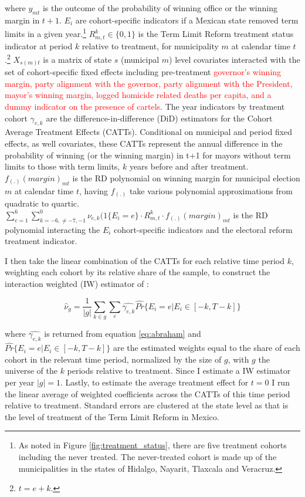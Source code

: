 \documentclass[12pt]{amsart}
\numberwithin{equation}{section}
\theoremstyle{definition}
\theoremstyle{definition}
\theoremstyle{definition}
\begin{document}
where $y_{mt}$ is the outcome of the probability of winning office or the winning margin in $t+1$. $E_i$ are cohort-specific indicators if a Mexican state removed term limits in a given year.\footnote{As noted in Figure \ref{fig:treatment_status}, there are five treatment cohorts including the never treated. The never-treated cohort is made up of the municipalities in the states of Hidalgo, Nayarit, Tlaxcala and Veracruz.} $R^k_{m,t}\in \{0,1\}$  is the Term Limit Reform treatment status indicator at period $k$ relative to treatment, for municipality $m$ at calendar time $t$.\footnote{$t=e+k$.} $X_{s(m)t}$ is a matrix of state $s$ (municipal $m$) level covariates interacted with the set of cohort-specific fixed effects including pre-treatment \textcolor{red}{governor's winning margin, party alignment with the governor, party alignment with the President, mayor's winning margin, logged homicide related deaths per capita, and a dummy indicator on the presence of cartels}.  The year indicators by treatment cohort  $\gamma_{e,k}$ are the difference-in-difference (DiD) estimators for the Cohort Average Treatment Effects (CATTs). Conditional on municipal and period fixed effects, as well covariates, these CATTs represent the annual difference in the probability of winning (or the winning margin) in t+1 for mayors without term limits to those with term limits, $k$ years before and after treatment. $f_{(.)}(margin)_{mt}$ is the RD polynomial on winning margin for municipal election $m$ at calendar time $t$, having $f_{(.)}$ take various polynomial approximations from quadratic to quartic. $\sum^6_{e=1} \sum^{0}_{k=-6, \neq {-7,-1}} \nu_{e,k}(1\{E_i=e\} \cdot R^k_{m,t} \cdot  f_{(.)}(margin)_{mt}  $ is the RD polynomial interacting the $E_i$ cohort-specific indicators and the electoral reform treatment indicator. 

I then take the linear combination of the CATTs for each relative time period $k$, weighting each cohort by its relative share of the sample, to construct the interaction weighted (IW) estimator of \citet{abraham_sun_2020}:   

\begin{equation}
\hat{\nu}_g=\frac{1}{|g|}\sum_{k \in g}\sum_e \hat{\gamma_{e,k}} \hat{Pr}\{E_i=e | E_i \in [-k, T-k]\}	
\end{equation}
  
where $\hat{\gamma_{e,k}}$ is returned from equation \ref{eq:abraham} and $\hat{Pr}\{E_i=e | E_i \in [-k, T-k]\}$  are the estimated weights equal to the share of each cohort in the relevant time period, normalized by the size of  $g$, with $g$ the universe of the $k$ periods relative to treatment. Since I estimate a IW estimator per year $|g|=1$. Lastly, to estimate the average treatment effect for $t=0$ I run the linear average of weighted coefficients across the CATTs of this time period relative to treatment.  Standard errors are clustered at the state level as that is the level of treatment of the Term Limit Reform in Mexico. 
\end{document}
